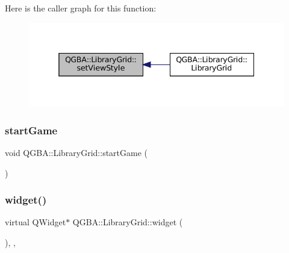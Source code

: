 Here is the caller graph for this function\+:
\nopagebreak
\begin{figure}[H]
\begin{center}
\leavevmode
\includegraphics[width=338pt]{class_q_g_b_a_1_1_library_grid_a5a2c5ce5dcd4452e7971f8eff5c3c7bd_icgraph}
\end{center}
\end{figure}
\mbox{\label{class_q_g_b_a_1_1_library_grid_af22adb696b19fda67d06fbc9f562d1c9}} 
\subsubsection{\texorpdfstring{start\+Game}{startGame}}
{\footnotesize\ttfamily void Q\+G\+B\+A\+::\+Library\+Grid\+::start\+Game (\begin{DoxyParamCaption}{ }\end{DoxyParamCaption})\hspace{0.3cm}{\ttfamily [signal]}}

\mbox{\label{class_q_g_b_a_1_1_library_grid_ad2502591d78d5f1dcef0e68ecece6fa1}} 
\subsubsection{\texorpdfstring{widget()}{widget()}}
{\footnotesize\ttfamily virtual Q\+Widget$\ast$ Q\+G\+B\+A\+::\+Library\+Grid\+::widget (\begin{DoxyParamCaption}{ }\end{DoxyParamCaption})\hspace{0.3cm}{\ttfamily [inline]}, {\ttfamily [override]}, {\ttfamily [virtual]}}



